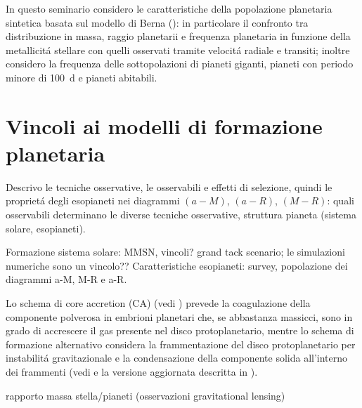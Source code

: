 \documentclass[twoside,11pt,fleqn]{memoir}%
\begin{document}
In questo seminario considero le caratteristiche della popolazione planetaria sintetica basata sul modello di Berna (\cite{mordasini2018planetary}): in particolare il confronto tra distribuzione in massa, raggio planetarii e frequenza planetaria in funzione della metallicit\'a stellare con quelli osservati tramite velocit\'a radiale e transiti; inoltre considero la frequenza delle sottopolazioni di pianeti giganti, pianeti con periodo minore di \SI{100}{\day} e pianeti abitabili.


{\let\clearpage\relax\let\cleardoublepage\relax
\part{Vincoli ai modelli di formazione planetaria}
}
\begin{errata}
Descrivo le tecniche osservative, le osservabili e effetti di selezione, quindi le propriet\'a degli esopianeti nei diagrammi $(a-M)$, $(a-R)$, $(M-R)$: quali osservabili determinano le diverse tecniche osservative, struttura pianeta (sistema solare, esopianeti).
\end{errata}

\begin{workout}
Formazione sistema solare: MMSN, vincoli? grand tack scenario; le simulazioni numeriche sono un vincolo??
Caratteristiche esopianeti: survey, popolazione dei diagrammi a-M, M-R e a-R.

\end{workout}

\begin{workout}
Lo schema di core accretion (CA) (vedi \cite{safronov1972evolution}) prevede la coagulazione della componente polverosa in embrioni planetari che, se abbastanza massicci, sono in grado di accrescere il gas presente nel disco protoplanetario, mentre lo schema di formazione alternativo considera la frammentazione del disco protoplanetario per instabilit\'a gravitazionale e la condensazione della componente solida all'interno dei frammenti (vedi \cite{kuiper1951origin} e la versione aggiornata descritta in \cite{nayakshin2017dawes}).
\end{workout}

\begin{workout}
	rapporto massa stella/pianeti (osservazioni gravitational lensing)
\end{workout}
\end{document}
